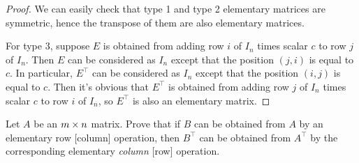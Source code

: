 \begin{proof}
We can easily check that type 1 and type 2 elementary matrices are symmetric, hence the transpose of them are also elementary matrices.

For type 3, suppose \(E\) is obtained from adding row \(i\) of \(I_n\) times scalar \(c\) to row \(j\) of \(I_n\).
Then \(E\) can be considered as \(I_n\) except that the position \((j, i)\) is equal to \(c\).
In particular, \(E^\top\) can be considered as \(I_n\) except that the position \((i, j)\) is equal to \(c\).
Then it's obvious that \(E^\top\) is obtained from adding row \(j\) of \(I_n\) times scalar \(c\) to row \(i\) of \(I_n\), so \(E^\top\) is also an elementary matrix.
\end{proof}

\begin{exercise} \label{exercise 3.1.6}
Let \(A\) be an \(m \times n\) matrix.
Prove that if \(B\) can be obtained from \(A\) by an elementary row [column] operation, then \(B^\top\) can be obtained from
\(A^\top\) by the corresponding elementary \emph{column} [row] operation.
\end{exercise}

